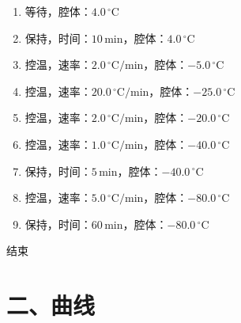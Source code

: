 \documentclass[UTF8,10pt,a4paper,fontset=fandol]{ctexart}
\begin{document}
\begin{enumerate}
  \item 等待，腔体：$4.0\,^{\circ}\mathrm{C}$
  \item 保持，时间：$10\,\mathrm{min}$，腔体：$4.0\,^{\circ}\mathrm{C}$
  \item 控温，速率：$2.0\,^{\circ}\mathrm{C}/\mathrm{min}$，腔体：$-5.0\,^{\circ}\mathrm{C}$
  \item 控温，速率：$20.0\,^{\circ}\mathrm{C}/\mathrm{min}$，腔体：$-25.0\,^{\circ}\mathrm{C}$
  \item 控温，速率：$2.0\,^{\circ}\mathrm{C}/\mathrm{min}$，腔体：$-20.0\,^{\circ}\mathrm{C}$
  \item 控温，速率：$1.0\,^{\circ}\mathrm{C}/\mathrm{min}$，腔体：$-40.0\,^{\circ}\mathrm{C}$
  \item 保持，时间：$5\,\mathrm{min}$，腔体：$-40.0\,^{\circ}\mathrm{C}$
  \item 控温，速率：$5.0\,^{\circ}\mathrm{C}/\mathrm{min}$，腔体：$-80.0\,^{\circ}\mathrm{C}$
  \item 保持，时间：$60\,\mathrm{min}$，腔体：$-80.0\,^{\circ}\mathrm{C}$
\end{enumerate}

结束

\section*{二、曲线}

\begin{figure}[h]
  \centering
\end{figure}

\newpage
\end{document}

